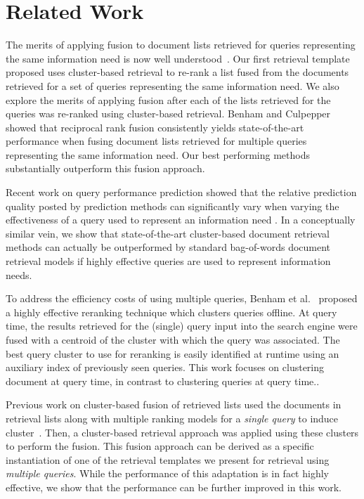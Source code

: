 \section{Related Work}
\label{sec:rel}
The merits of applying fusion to document lists retrieved for queries
representing the same information need is now well
understood~\cite{Belkin+al:93a,Belkin+al:95a,Pickens+al:08a,bailey2017retrieval,bc17-adcs,Benham+al:19a}.
Our first retrieval template proposed uses cluster-based retrieval to
re-rank a list fused from the documents retrieved for a set of
queries representing the same information need.
We also explore the merits of applying fusion after each of the lists
retrieved for the queries was re-ranked using cluster-based
retrieval.
Benham and Culpepper \cite{bc17-adcs} showed that reciprocal rank
fusion \cite{Cormack+al:09a} consistently yields state-of-the-art
performance when fusing document lists retrieved for multiple queries
representing the same information need.
Our best performing methods substantially outperform this fusion
approach.

Recent work on query performance prediction showed that the relative
prediction quality posted by prediction methods can significantly
vary when varying the effectiveness of a query used to represent an
information need \cite{Zendel+al:19a}.
In a conceptually similar vein, we show that state-of-the-art
cluster-based document retrieval methods can actually be outperformed
by standard bag-of-words document retrieval models if highly
effective queries are used to represent information needs.

To address the efficiency costs of using multiple queries, Benham et
al.~\cite{Benham+al:19a} proposed a highly effective reranking
technique which clusters queries offline.
At query time, the results retrieved for the (single) query input
into the search engine were fused with a centroid of the cluster with
which the query was associated.
The best query cluster to use for reranking is easily identified at
runtime using an auxiliary index of previously seen queries.
This work focuses on clustering document at query time, in contrast
to clustering queries at query time..

Previous work on cluster-based fusion of retrieved lists used the
documents in retrieval lists along with multiple ranking models for a
{\em single query} to induce cluster~\cite{Kozorovitzky+Kurland:11b}.
Then, a cluster-based retrieval approach was applied using these
clusters to perform the fusion.
This fusion approach can be derived as a specific instantiation of
one of the retrieval templates we present for retrieval using {\em
multiple queries}.
While the performance of this adaptation is in fact highly effective,
we show that the performance can be further improved in this work.

